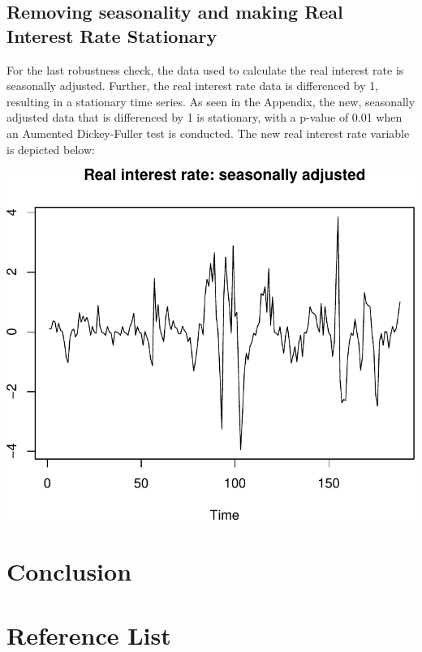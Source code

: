 \documentclass[11pt,preprint, authoryear]{elsarticle}
\numberwithin{equation}{section}
\numberwithin{figure}{section}
\numberwithin{table}{section}
\begin{document}
\hypertarget{removing-seasonality-and-making-real-interest-rate-stationary}{%
\subsection{Removing seasonality and making Real Interest Rate
Stationary}\label{removing-seasonality-and-making-real-interest-rate-stationary}}

For the last robustness check, the data used to calculate the real
interest rate is seasonally adjusted. Further, the real interest rate
data is differenced by 1, resulting in a stationary time series. As seen
in the Appendix, the new, seasonally adjusted data that is differenced
by 1 is stationary, with a p-value of 0.01 when an Aumented
Dickey-Fuller test is conducted. The new real interest rate variable is
depicted below:

\includegraphics{TS_proj_files/figure-latex/unnamed-chunk-25-1.pdf}

\hypertarget{conclusion}{%
\section{Conclusion}\label{conclusion}}

\newpage

\hypertarget{reference-list}{%
\section{Reference List}\label{reference-list}}
\end{document}
